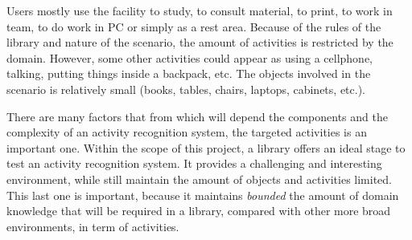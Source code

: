 Users mostly use the facility to study, to consult material, to print, to work in team, to do work in PC or simply as a rest area.
Because of the rules of the library and nature of the scenario, the amount of activities is restricted by the domain.
However, some other activities could appear as using a cellphone, talking, putting things inside a backpack, etc.
The objects involved in the scenario is relatively small (books, tables, chairs, laptops, cabinets, etc.).

There are many factors that from which will depend the components and the complexity of an activity recognition system, the targeted activities is an important one.
Within the scope of this project, a library offers an ideal stage to test an activity recognition system.
It provides a challenging and interesting environment, while still maintain the amount of objects and activities limited.
This last one is important, because it maintains \textit{bounded} the amount of domain knowledge that will be required in a library, compared with other more broad environments, in term of activities.







